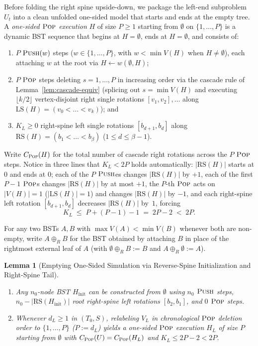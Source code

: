 \documentclass[11pt]{article}
\newtheorem{lemma}[theorem]{Lemma}
\theoremstyle{definition}
\theoremstyle{remark}
\newcommand{\LS}{\mathrm{LS}}
\newcommand{\RS}{\mathrm{RS}}
\newcommand{\PUSH}{\textnormal{\scshape Push}}
\newcommand{\POP}{\textnormal{\scshape Pop}}
\begin{document}
Before folding the right spine upside-down, we package the left-end subproblem $U_t$ into a clean unfolded one-sided model that starts and ends at the empty tree. A \emph{one-sided $\POP$ execution} $H$ of size $P \ge 1$ starting from $\emptyset$ on $\{1, \dots, P\}$ is a dynamic BST sequence that begins at $H = \emptyset$, ends at $H = \emptyset$, and consists of:
\begin{enumerate}[label=(\roman*), leftmargin=2em, itemsep=1pt]
  \item $P$ $\PUSH(w)$ steps ($w \in \{1, \dots, P\}$, with $w < \min V(H)$ when $H \ne \emptyset$), each attaching $w$ at the root via $H \gets w(\emptyset, H)$;
  \item $P$ $\POP$ steps deleting $s = 1, \dots, P$ in increasing order via the cascade rule of Lemma~\ref{lem:cascade-equiv} (splicing out $s = \min V(H)$ and executing $\lfloor k / 2 \rfloor$ vertex-disjoint right single rotations $[v_1, v_2], \dots$ along $\LS(H) = (v_0 < \dots < v_k)$); and
  \item $K_L \ge 0$ right-spine left single rotations $[b_{d+1}, b_d]$ along $\RS(H) = (b_1 < \dots < b_\beta)$ ($1 \le d \le \beta - 1$).
\end{enumerate}
Write $C_{\POP}(H)$ for the total number of cascade right rotations across the $P$ $\POP$ steps. Notice in three lines that $K_L < 2P$ holds automatically: $|\RS(H)|$ starts at $0$ and ends at $0$; each of the $P$ $\PUSH$es changes $|\RS(H)|$ by $+1$, each of the first $P - 1$ $\POP$s changes $|\RS(H)|$ by at most $+1$, the $P$-th $\POP$ acts on $|V(H)| = 1$ ($|\LS(H)| = 1$) and changes $|\RS(H)|$ by $-1$, and each right-spine left rotation $[b_{d+1}, b_d]$ decreases $|\RS(H)|$ by~$1$, forcing
\begin{equation}
\label{eq:KL-bound}
K_L \;\le\; P + (P - 1) - 1 \;=\; 2P - 2 \;<\; 2P.
\end{equation}

For any two BSTs $A, B$ with $\max V(A) < \min V(B)$ whenever both are non-empty, write $A \oplus_R B$ for the BST obtained by attaching $B$ in place of the rightmost external leaf of $A$ (with $\emptyset \oplus_R B := B$ and $A \oplus_R \emptyset := A$).

\begin{lemma}[Emptying One-Sided Simulation via Reverse-Spine Initialization and Right-Spine Tail]
\label{lem:emptying-sim}
\leavevmode
\begin{enumerate}[label=(\arabic*)]
  \item Any $n_0$-node BST $H_{\mathrm{init}}$ can be constructed from $\emptyset$ using $n_0$ $\PUSH$ steps, $n_0 - |\RS(H_{\mathrm{init}})|$ root right-spine left rotations $[b_2, b_1]$, and $0$ $\POP$ steps.
  \item Whenever $d_L \ge 1$ in $(T_0, S)$, relabeling $V_L$ in chronological $\POP$ deletion order to $\{1, \dots, P\}$ ($P := d_L$) yields a one-sided $\POP$ execution $H_L$ of size $P$ starting from $\emptyset$ with $C_{\POP}(U) = C_{\POP}(H_L)$ and $K_L \le 2P - 2 < 2P$.
\end{enumerate}
\end{lemma}
\end{document}
